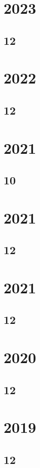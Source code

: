 \documentclass[11pt]{book}
\begin{document}
\section{2023}
\subsection{12}


\section{2022}
\subsection{12}

\section{2021}
\subsection{10}

\section{2021}
\subsection{12}

\section{2021}
\subsection{12}

\section{2020}
\subsection{12}

\section{2019}
\subsection{12}


\end{document}
